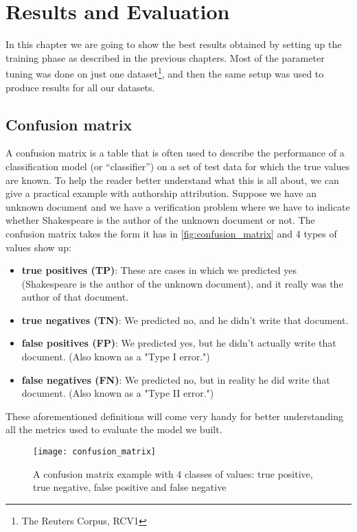 \chapter{Results and Evaluation}
In this chapter we are going to show the best results obtained by setting up the training phase as described in the previous chapters. Most of the parameter tuning was done on just one dataset\footnote{The Reuters Corpus, RCV1}, and then the same setup was used to produce results for all our datasets.

\section{Confusion matrix}
A confusion matrix is a table that is often used to describe the performance of a classification model (or \enquote{classifier}) on a set of test data for which the true values are known.
To help the reader better understand what this is all about, we can give a practical example with authorship attribution. Suppose we have an unknown document and we have a verification problem where we have to indicate whether Shakespeare is the author of the unknown document or not.
The confusion matrix takes the form it has in \autoref{fig:confusion_matrix} and 4 types of values show up:

\begin{itemize}
	\item \textbf{true positives (TP)}: These are cases in which we predicted yes (Shakespeare is the author of the unknown document), and it really was the author of that document.
	\item \textbf{true negatives (TN)}: We predicted no, and he didn't write that document.
	\item \textbf{false positives (FP)}: We predicted yes, but he didn't actually write that document. (Also known as a "Type I error.")
	\item \textbf{false negatives (FN)}: We predicted no, but in reality he did write that document. (Also known as a "Type II error.")
\end{itemize}

These aforementioned definitions will come very handy for better understanding all the metrics used to evaluate the model we built.

\begin{figure}[ht]
	\centering
	\texttt{[image: confusion\_matrix]}
	\caption[Confusion matrix example]{A confusion matrix example with 4 classes of values: true positive, true negative, false positive and false negative}
	\label{fig:confusion_matrix}
\end{figure}

